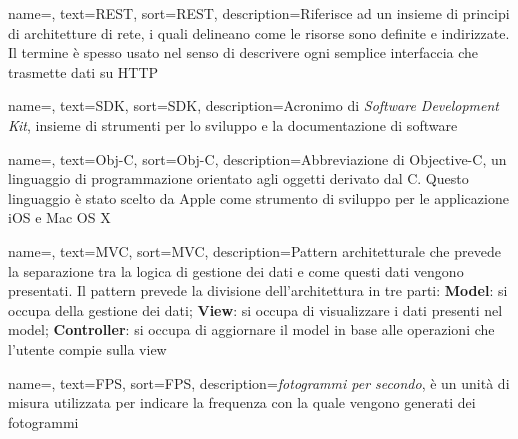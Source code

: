 {
    name=,
    text=REST,
    sort=REST,
    description={Riferisce ad un insieme di principi di architetture di rete, i quali delineano come le risorse sono definite e indirizzate. Il termine è spesso usato nel senso di descrivere ogni semplice interfaccia che trasmette dati su HTTP}
}

{
name=,
text=SDK,
sort=SDK,
description={Acronimo di \textit{Software Development Kit}, insieme di strumenti per lo sviluppo e la documentazione di software}
}

{
    name=,
    text=Obj-C,
    sort=Obj-C,
    description={Abbreviazione di Objective-C, un linguaggio di programmazione orientato agli oggetti derivato dal C. Questo linguaggio è stato scelto da Apple come strumento di sviluppo per le applicazione iOS e Mac OS X}
}

{
    name=,
    text=MVC,
    sort=MVC,
    description={Pattern architetturale che prevede la separazione tra la logica di gestione dei dati e come questi dati vengono presentati. Il pattern prevede la divisione dell'architettura in tre parti: \textbf{Model}: si occupa della gestione dei dati; \textbf{View}: si occupa di visualizzare i dati presenti nel model; \textbf{Controller}: si occupa di aggiornare il model in base alle operazioni che l'utente compie sulla view}
}

{
name=,
text=FPS,
sort=FPS,
description={\textit{fotogrammi per secondo}, è un unità di misura utilizzata per indicare la frequenza con la quale vengono generati dei fotogrammi}
}
